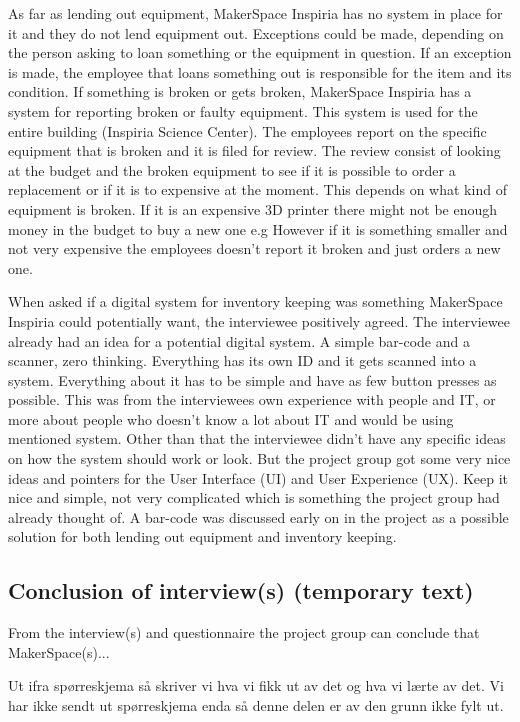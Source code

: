 As far as lending out equipment, MakerSpace Inspiria has no system in place for it and they do not lend equipment out. Exceptions could be made, depending on the person asking to loan something or the equipment in question. If an exception is made, the employee that loans something out is responsible for the item and its condition. If something is broken or gets broken, MakerSpace Inspiria has a system for reporting broken or faulty equipment. This system is used for the entire building (Inspiria Science Center). The employees report on the specific equipment that is broken and it is filed for review. The review consist of looking at the budget and the broken equipment to see if it is possible to order a replacement or if it is to expensive at the moment. This depends on what kind of equipment is broken. If it is an expensive 3D printer there might not be enough money in the budget to buy a new one e.g However if it is something smaller and not very expensive the employees doesn't report it broken and just orders a new one. 

When asked if a digital system for inventory keeping was something MakerSpace Inspiria could potentially want, the interviewee positively agreed. The interviewee already had an idea for a potential digital system. A simple bar-code and a scanner, zero thinking. Everything has its own ID and it gets scanned into a system. Everything about it has to be simple and have as few button presses as possible. This was from the interviewees own experience with people and IT, or more about people who doesn't know a lot about IT and would be using mentioned system. Other than that the interviewee didn't have any specific ideas on how the system should work or look. But the project group got some very nice ideas and pointers for the User Interface (UI) and User Experience (UX). Keep it nice and simple, not very complicated which is something the project group had already thought of. A bar-code was discussed early on in the project as a possible solution for both lending out equipment and inventory keeping. 

\subsection{Conclusion of interview(s) (temporary text)}

From the interview(s) and questionnaire the project group can conclude that MakerSpace(s)... 

Ut ifra spørreskjema så skriver vi hva vi fikk ut av det og hva vi lærte av det. Vi har ikke sendt ut spørreskjema enda så denne delen er av den grunn ikke fylt ut.
